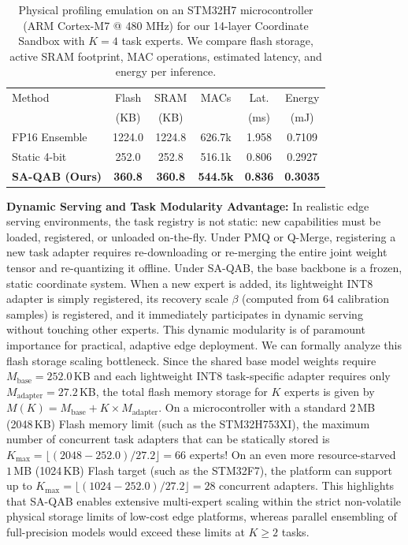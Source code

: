 \begin{table}[t]
\caption{Physical profiling emulation on an STM32H7 microcontroller (ARM Cortex-M7 @ 480 MHz) for our 14-layer Coordinate Sandbox with $K=4$ task experts. We compare flash storage, active SRAM footprint, MAC operations, estimated latency, and energy per inference.}
\label{tab:hardware_profiling}
\vskip 0.15in
\begin{center}
\begin{small}
\begin{sc}
\setlength{\tabcolsep}{2.5pt}
\begin{tabular}{lccccc}
\toprule
Method & Flash & SRAM & MACs & Lat. & Energy \\
 & (KB) & (KB) & & (ms) & (mJ) \\
\midrule
FP16 Ensemble & 1224.0 & 1224.8 & 626.7k & 1.958 & 0.7109 \\
Static 4-bit & 252.0 & 252.8 & 516.1k & 0.806 & 0.2927 \\
\textbf{SA-QAB (Ours)} & \textbf{360.8} & \textbf{360.8} & \textbf{544.5k} & \textbf{0.836} & \textbf{0.3035} \\
\bottomrule
\end{tabular}
\end{sc}
\end{small}
\end{center}
\vskip -0.1in
\end{table}

\textbf{Dynamic Serving and Task Modularity Advantage:} In realistic edge serving environments, the task registry is not static: new capabilities must be loaded, registered, or unloaded on-the-fly. Under PMQ or Q-Merge, registering a new task adapter requires re-downloading or re-merging the entire joint weight tensor and re-quantizing it offline. Under SA-QAB, the base backbone is a frozen, static coordinate system. When a new expert is added, its lightweight INT8 adapter is simply registered, its recovery scale $\beta$ (computed from 64 calibration samples) is registered, and it immediately participates in dynamic serving without touching other experts. This dynamic modularity is of paramount importance for practical, adaptive edge deployment. We can formally analyze this flash storage scaling bottleneck. Since the shared base model weights require $M_{\text{base}} = 252.0$\,KB and each lightweight INT8 task-specific adapter requires only $M_{\text{adapter}} = 27.2$\,KB, the total flash memory storage for $K$ experts is given by $M(K) = M_{\text{base}} + K \times M_{\text{adapter}}$. On a microcontroller with a standard $2$\,MB (2048\,KB) Flash memory limit (such as the STM32H753XI), the maximum number of concurrent task adapters that can be statically stored is $K_{\max} = \lfloor (2048 - 252.0) / 27.2 \rfloor = 66$ experts! On an even more resource-starved $1$\,MB (1024\,KB) Flash target (such as the STM32F7), the platform can support up to $K_{\max} = \lfloor (1024 - 252.0) / 27.2 \rfloor = 28$ concurrent adapters. This highlights that SA-QAB enables extensive multi-expert scaling within the strict non-volatile physical storage limits of low-cost edge platforms, whereas parallel ensembling of full-precision models would exceed these limits at $K \ge 2$ tasks.

